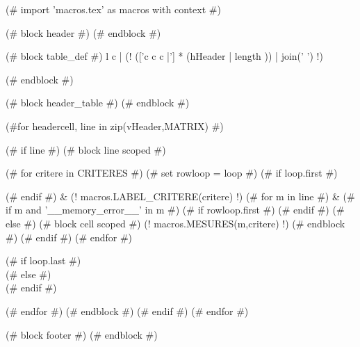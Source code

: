 (# import 'macros.tex' as macros with context #)

(# block header #)
(# endblock #)


\setlength\tabcolsep{0.07cm}
\begin{longtable}
    (# block table_def #){ l c | (! (['c c c |'] *  (hHeader | length )) | join(' ') !) }
    (# endblock #)



    (# block header_table #)
    (# endblock #)


    \endfirsthead
    \endhead
    \endfoot
    \endlastfoot

    (#for headercell, line in zip(vHeader,MATRIX) #)

    (# if line #)
    \hline
    (# block line scoped #)

    (# for critere in CRITERES #)
    (# set rowloop = loop #)
    (# if loop.first #)


    (# endif #)
    & (! macros.LABEL_CRITERE(critere) !)
    (# for m in line #)
    &
    (# if m and '__memory_error__' in m #)
    (# if rowloop.first #)  (# endif #)
    (# else #)
    (# block cell scoped #)
    (! macros.MESURES(m,critere) !)
    (# endblock #)
    (# endif #)
    (# endfor #)

    (# if loop.last #) \\ (# else #) \\* (# endif #)

    (# endfor #)
    (# endblock #)
    (# endif #)
    (# endfor #)
    \hline
    \caption{\textbf{(! title !)}. (! description !)}
    \label{tab:(! label !)}
\end{longtable}


(# block footer #)
(# endblock #)
